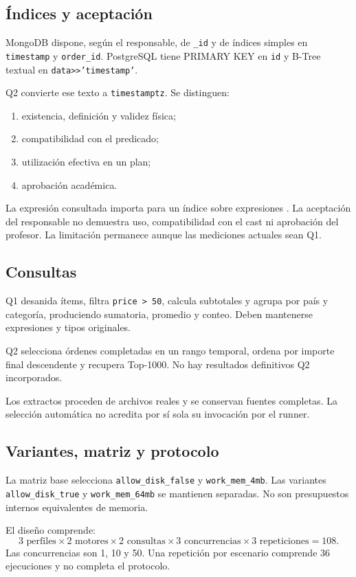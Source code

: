 \subsection{Índices y aceptación}
MongoDB dispone, según el responsable, de \texttt{\_id} y de índices
simples en \texttt{timestamp} y \texttt{order\_id}.
PostgreSQL tiene PRIMARY KEY en \texttt{id} y B-Tree textual en
\texttt{data\textgreater\textgreater{}'timestamp'}.

Q2 convierte ese texto a \texttt{timestamptz}. Se distinguen:
\begin{enumerate}
\item existencia, definición y validez física;
\item compatibilidad con el predicado;
\item utilización efectiva en un plan;
\item aprobación académica.
\end{enumerate}
La expresión consultada importa para un índice sobre expresiones
\cite{pgindex}. La aceptación del responsable no demuestra uso,
compatibilidad con el cast ni aprobación del profesor.
La limitación permanece aunque las mediciones actuales sean Q1.

\subsection{Consultas}
Q1 desanida ítems, filtra \texttt{price > 50}, calcula subtotales y
agrupa por país y categoría, produciendo sumatoria, promedio y conteo.
Deben mantenerse expresiones y tipos originales.

Q2 selecciona órdenes completadas en un rango temporal, ordena por
importe final descendente y recupera Top-1000. No hay resultados
definitivos Q2 incorporados.

Los extractos proceden de archivos reales y se conservan fuentes completas.
La selección automática no acredita por sí sola su invocación por el runner.


\subsection{Variantes, matriz y protocolo}
La matriz base selecciona \texttt{allow\_disk\_false} y
\texttt{work\_mem\_4mb}. Las variantes \texttt{allow\_disk\_true}
y \texttt{work\_mem\_64mb} se mantienen separadas. No son presupuestos
internos equivalentes de memoria.

El diseño comprende:
\[
3\text{ perfiles}\times2\text{ motores}\times2\text{ consultas}
\times3\text{ concurrencias}\times3\text{ repeticiones}=108.
\]
Las concurrencias son 1, 10 y 50. Una repetición por escenario comprende
36 ejecuciones y no completa el protocolo.

